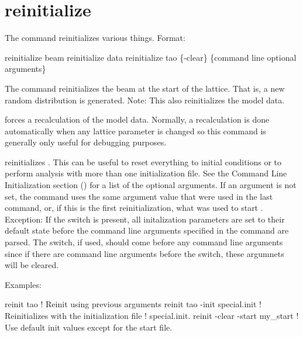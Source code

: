 \section{reinitialize}
\label{s:reinit}

The  command reinitializes various things. Format:
\begin{example}
  reinitialize beam
  reinitialize data
  reinitialize tao \{-clear\} \{command line optional arguments\}
\end{example}

\vskip 10pt 

The  command reinitializes the beam at the start of the lattice. That is, a
new random distribution is generated.  Note: This also reinitializes the model data.

 forces a recalculation of the model data.  Normally, a recalculation is done
automatically when any lattice parameter is changed so this command is generally only useful for
debugging purposes.

 reinitializes \tao. This can be useful to reset everything to initial
conditions or to perform analysis with more than one initialization file. See the Command Line
Initialization section () for a list of the optional arguments. If an argument
is not set, the  command uses the same argument value that were used in the last
 command, or, if this is the first reinitialization, what was used to start \tao.
Exception: If the  switch is present, all initalization parameters are set to their
default state before the command line arguments specified in the  command are
parsed. The  switch, if used, should come before any command line arguments since if
there are command line arguments before the  switch, these argumnets will be cleared.

Examples:
\begin{example}
  reinit tao                         ! Reinit using previous arguments
  reinit tao -init special.init      ! Reinitializes \tao with the initialization file 
                                     !   special.init.
  reinit -clear -start my_start      ! Use default init values except for the start file.                    
\end{example}


